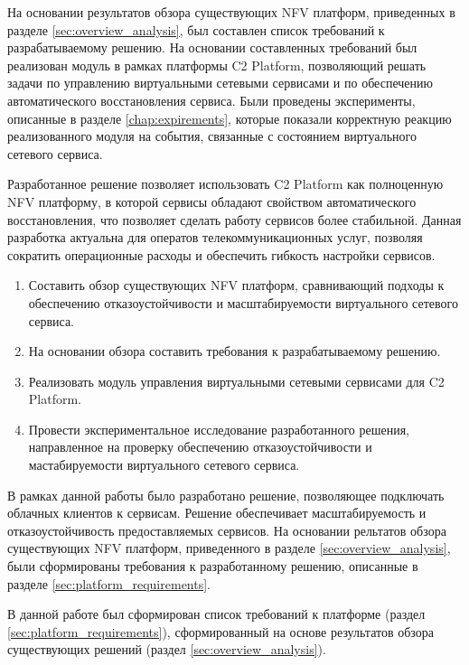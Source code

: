 \documentclass[oneside,final,14pt,a4paper]{extreport}
\begin{document}
На основании результатов обзора существующих NFV платформ, приведенных в разделе \ref{sec:overview_analysis}, был составлен список требований к разрабатываемому решению. На основании составленных требований был реализован модуль в рамках платформы C2 Platform, позволяющий решать задачи по управлению виртуальными сетевыми сервисами и по обеспечению автоматического восстановления сервиса. Были проведены эксперименты, описанные в разделе \ref{chap:expirements}, которые показали корректную реакцию реализованного модуля на события, связанные с состоянием виртуального сетевого сервиса.

Разработанное решение позволяет использовать C2 Platform как полноценную NFV платформу, в которой сервисы обладают свойством автоматического восстановления, что позволяет сделать работу сервисов более стабильной. Данная разработка актуальна для оператов телекоммуникационных услуг, позволяя сократить операционные расходы и обеспечить гибкость настройки сервисов.

\vspace{3cm}

\begin{enumerate}
	\item Составить обзор существующих NFV платформ, сравнивающий подходы к обеспечению отказоустойчивости и масштабируемости виртуального сетевого сервиса.
	\item На основании обзора составить требования к разрабатываемому решению.
	\item Реализовать модуль управления виртуальными сетевыми сервисами для C2 Platform.
	\item Провести экспериментальное исследование разработанного решения, направленное на проверку обеспечению отказоустойчивости и мастабируемости виртуального сетевого сервиса.
\end{enumerate}





В рамках данной работы было разработано решение, позволяющее подключать облачных клиентов к сервисам. Решение обеспечивает масштабируемость и отказоустойчивость предоставляемых сервисов. На основании рельтатов обзора существующих NFV платформ, приведенного в разделе \ref{sec:overview_analysis}, были сформированы требования к разработанному решению, описанные в разделе \ref{sec:platform_requirements}. 

В данной работе был сформирован список требований к платформе (раздел \ref{sec:platform_requirements}), сформированный на основе результатов обзора существующих решений (раздел \ref{sec:overview_analysis}).
\end{document}
